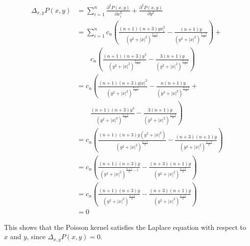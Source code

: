 \begin{align*}
    \Delta_{x,y} P(x,y)&=\sum_{i=1}^n\frac{\partial^2P(x,y)}{\partial x_i^2}+\frac{\partial^2P(x,y)}{\partial y^2} \\
    &=\sum_{i=1}^nc_n\left(\frac{(n+1)(n+3)yx_i^2}{(y^2+|x|^2)^{\frac{n+5}{2}}}-\frac{(n+1)y}{(y^2+|x|^2)^{\frac{n+3}{2}}} \right)+ \\
    &\quad\quad c_n\left(\frac{(n+1)(n+3)y^3}{(y^2+|x|^2)^{\frac{n+5}{2}}}-\frac{3(n+1)y}{(y^2+|x|^2)^{\frac{n+3}{2}}} \right) \\
    &=c_n\left(\frac{(n+1)(n+3)y|x|^2}{(y^2+|x|^2)^{\frac{n+5}{2}}}-\frac{n(n+1)y}{(y^2+|x|^2)^{\frac{n+3}{2}}} \right.+\\
    &\quad\quad \left. \frac{(n+1)(n+3)y^3}{(y^2+|x|^2)^{\frac{n+5}{2}}}-\frac{3(n+1)y}{(y^2+|x|^2)^{\frac{n+3}{2}}} \right) \\
    &=c_n\left(\frac{(n+1)(n+3)y(y^2+|x|^2)}{(y^2+|x|^2)^{\frac{n+5}{2}}}-\frac{(n+3)(n+1)y}{(y^2+|x|^2)^{\frac{n+3}{2}}} \right) \\
    &=c_n\left(\frac{(n+1)(n+3)y}{(y^2+|x|^2)^{\frac{n+5}{2}-1}}-\frac{(n+3)(n+1)y}{(y^2+|x|^2)^{\frac{n+3}{2}}} \right) \\
    &=c_n\left(\frac{(n+1)(n+3)y}{(y^2+|x|^2)^{\frac{n+3}{2}}}-\frac{(n+3)(n+1)y}{(y^2+|x|^2)^{\frac{n+3}{2}}} \right) \\
    &=0
\end{align*}

This shows that the Poisson kernel satisfies the Laplace equation with respect to $x$ and $y$, since $\Delta_{x,y}P(x,y)=0$.